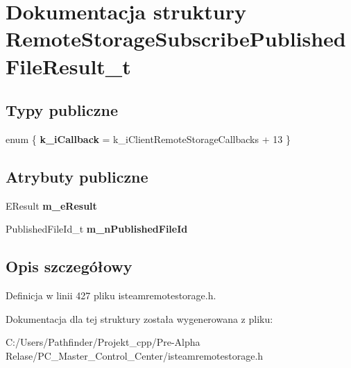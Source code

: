\hypertarget{struct_remote_storage_subscribe_published_file_result__t}{}\section{Dokumentacja struktury Remote\+Storage\+Subscribe\+Published\+File\+Result\+\_\+t}
\label{struct_remote_storage_subscribe_published_file_result__t}
\subsection*{Typy publiczne}
\begin{DoxyCompactItemize}
\item 
\mbox{\label{struct_remote_storage_subscribe_published_file_result__t_a9e4c7a4699c4695fcca2ac51901c988f}} 
enum \{ {\bfseries k\+\_\+i\+Callback} = k\+\_\+i\+Client\+Remote\+Storage\+Callbacks + 13
 \}
\end{DoxyCompactItemize}
\subsection*{Atrybuty publiczne}
\begin{DoxyCompactItemize}
\item 
\mbox{\label{struct_remote_storage_subscribe_published_file_result__t_a46666f9551a3df415f92412f5f7e2d31}} 
E\+Result {\bfseries m\+\_\+e\+Result}
\item 
\mbox{\label{struct_remote_storage_subscribe_published_file_result__t_af07dccf1615ee75eeb0bb09493df0e1c}} 
Published\+File\+Id\+\_\+t {\bfseries m\+\_\+n\+Published\+File\+Id}
\end{DoxyCompactItemize}


\subsection{Opis szczegółowy}


Definicja w linii 427 pliku isteamremotestorage.\+h.



Dokumentacja dla tej struktury została wygenerowana z pliku\+:\begin{DoxyCompactItemize}
\item 
C\+:/\+Users/\+Pathfinder/\+Projekt\+\_\+cpp/\+Pre-\/\+Alpha Relase/\+P\+C\+\_\+\+Master\+\_\+\+Control\+\_\+\+Center/isteamremotestorage.\+h\end{DoxyCompactItemize}
